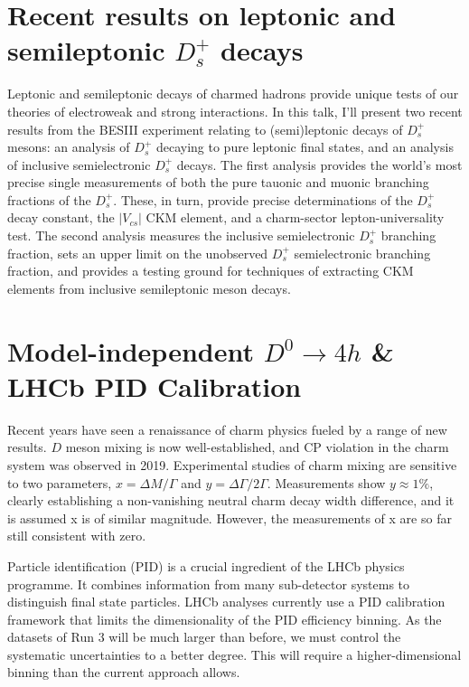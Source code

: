 \documentclass[12pt, a4paper, notitlepage, onecolumn]{article}
\begin{document}
\section{Recent results on leptonic and semileptonic $D_{s}^{+}$ decays}
\noindent Leptonic and semileptonic decays of charmed hadrons provide unique tests of our theories of electroweak and strong interactions. In this talk, I’ll present two recent results from the BESIII experiment relating to (semi)leptonic decays of $D_{s}^{+}$ mesons: an analysis of $D_{s}^{+}$ decaying to pure leptonic final states, and an analysis of inclusive semielectronic $D_{s}^{+}$ decays. The first analysis provides the world’s most precise single measurements of both the pure tauonic and muonic branching fractions of the $D_{s}^{+}$. These, in turn, provide precise determinations of the $D_{s}^{+}$ decay constant, the $|V_{cs}|$ CKM element, and a charm-sector lepton-universality test. The second analysis measures the inclusive semielectronic $D_{s}^{+}$ branching fraction, sets an upper limit on the unobserved $D_{s}^{+}$ semielectronic branching fraction, and provides a testing ground for techniques of extracting CKM elements from inclusive semileptonic meson decays.

\section{Model-independent $D^0\to 4h$ \& LHCb PID Calibration}
\noindent Recent years have seen a renaissance of charm physics fueled by a range of new results. $D$ meson mixing is now well-established, and CP violation in the charm system was observed in 2019. Experimental studies of charm mixing are sensitive to two parameters, $x = \Delta M/\Gamma$ and $y = \Delta \Gamma/2\Gamma$. Measurements show $y\approx 1\%$, clearly establishing a non-vanishing neutral charm decay width difference, and it is assumed x is of similar magnitude. However, the measurements of x are so far still consistent with zero.

 Particle identification (PID) is a crucial ingredient of the LHCb physics programme. It combines information from many sub-detector systems to distinguish final state particles. LHCb analyses currently use a PID calibration framework that limits the dimensionality of the PID efficiency binning. As the datasets of Run 3 will be much larger than before, we must control the systematic uncertainties to a better degree. This will require a higher-dimensional binning than the current approach allows.
\end{document}
